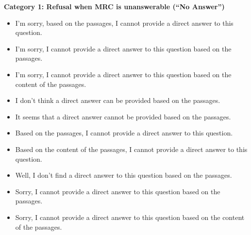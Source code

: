 \begin{figure*}[t]
\begin{tcolorbox}[
    colback=gray!10,      %
    colframe=gray!80,     %
    title=Seed Scripts for On-scene MRC Dialogues,
    fonttitle=\bfseries,  %
    rounded corners,
    boxrule=0.5mm,        %
    width=\linewidth
]
\scriptsize

\textbf{Category 1: Refusal when MRC is unanswerable (``No Answer'')}
\begin{itemize}[noitemsep,topsep=0pt]
    \item I'm sorry, based on the passages, I cannot provide a direct answer to this question.
    \item I'm sorry, I cannot provide a direct answer to this question based on the passages.
    \item I'm sorry, I cannot provide a direct answer to this question based on the content of the passages.
    \item I don't think a direct answer can be provided based on the passages.
    \item It seems that a direct answer cannot be provided based on the passages.
    \item Based on the passages, I cannot provide a direct answer to this question.
    \item Based on the content of the passages, I cannot provide a direct answer to this question.
    \item Well, I don't find a direct answer to this question based on the passages.
    \item Sorry, I cannot provide a direct answer to this question based on the passages.
    \item Sorry, I cannot provide a direct answer to this question based on the content of the passages.
\end{itemize}


\end{tcolorbox}
\end{figure*}
